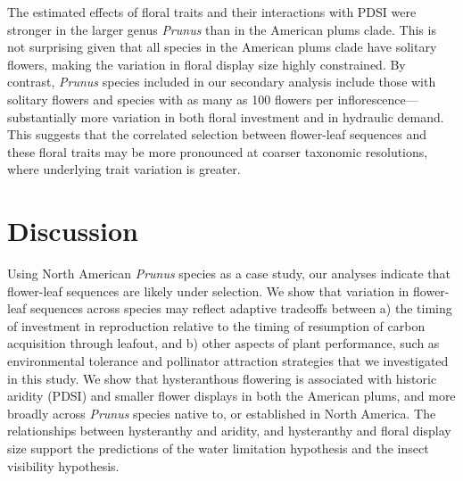 \documentclass{article}[12pt]
\begin{document}
{The estimated effects of floral traits and their interactions with PDSI were stronger in the larger genus \emph{Prunus} than in the American plums clade. This is not surprising given that all species in the American plums clade have solitary flowers, making the variation in floral display size highly constrained. By contrast, \emph{Prunus} species included in our secondary analysis include those with  solitary flowers and species with as many as 100 flowers per inflorescence---substantially more variation in both floral investment and in hydraulic demand. This suggests that the correlated selection between flower-leaf sequences and these floral traits may be more pronounced at coarser taxonomic resolutions, where underlying trait variation is greater.


\section*{Discussion}
Using North American \textit{Prunus} species as a case study, our analyses indicate that flower-leaf sequences are likely under selection. We show that variation in flower-leaf sequences across species may reflect adaptive tradeoffs between a) the timing of investment in reproduction relative to the timing of resumption of carbon acquisition through leafout, and b) other aspects of plant performance, such as environmental tolerance and pollinator attraction strategies that we investigated in this study. We show that hysteranthous flowering is associated with historic aridity (PDSI) and smaller flower displays in both the American plums, and more broadly across \emph{Prunus} species native to, or established in North America. The relationships between hysteranthy and aridity, and hysteranthy and floral display size support the predictions of the water limitation hypothesis and the insect visibility hypothesis. 

}
\end{document}
